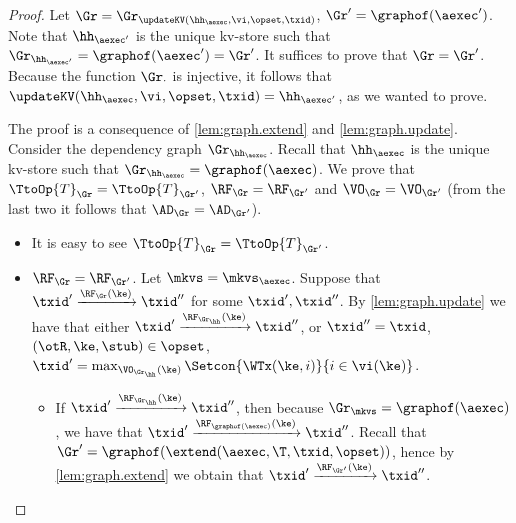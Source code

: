 \begin{proof}
Let $\Gr = \Gr_{\updateKV(\hh_{\aexec}, \vi, \opset, \txid)}$, $\Gr' = \graphof(\aexec')$. 
Note that $\hh_{\aexec'}$ is the unique kv-store such that $\Gr_{\hh_{\aexec'}} = \graphof(\aexec') = \Gr'$. 
It suffices to prove that $\Gr = \Gr'$. Because the function $\Gr_{\cdot}$ is injective, it follows that 
$\updateKV(\hh_{\aexec}, \vi, \opset, \txid) = \hh_{\aexec'}$, as we wanted to prove.  

The proof is a consequence of \cref{lem:graph.extend} and \cref{lem:graph.update}. 
Consider the dependency graph $\Gr_{\hh_{\aexec}}$.
Recall that $\hh_{\aexec}$ is the unique kv-store such that $\Gr_{\hh_{\aexec}} = \graphof(\aexec)$. 
We prove that $\TtoOp{T}_{\Gr} = \TtoOp{T}_{\Gr'}$, $\RF_{\Gr} = \RF_{\Gr'}$ and 
$\VO_{\Gr} = \VO_{\Gr'}$ (from the last two it follows that $\AD_{\Gr} = \AD_{\Gr'}$). 
\begin{itemize}
\item It is easy to see $\TtoOp{T}_{\Gr} = \TtoOp{T}_{\Gr'}$.

\item $\RF_{\Gr} = \RF_{\Gr'}$.
Let \( \mkvs  = \mkvs_\aexec \).
Suppose that $\txid' \xrightarrow{\RF_{\Gr}(\ke)} \txid''$ for some $\txid', \txid''$. 
By \cref{lem:graph.update} we have that either $\txid' \xrightarrow{\RF_{\Gr_\hh}(\ke)} \txid''$, 
or $\txid'' = \txid$, $(\otR, \ke, \stub) \in \opset$, $\txid' = \max_{\VO_{\Gr_\hh}(\ke)}\Setcon{\WTx(\ke, i) }{ i \in \vi(\ke)}$. 

\begin{itemize}
\item If $\txid' \xrightarrow{\RF_{\Gr_\hh}(\ke)} \txid''$, then because 
$\Gr_\mkvs = \graphof(\aexec)$, we have that $\txid' \xrightarrow{\RF_{\graphof(\aexec)}(\ke)} \txid''$. 
Recall that $\Gr' = \graphof(\extend(\aexec, \T, \txid, \opset))$, hence by \cref{lem:graph.extend} 
we obtain that $\txid' \xrightarrow{\RF_{\Gr'}(\ke)} \txid''$. 


\end{itemize}
\end{itemize}
\end{proof}
